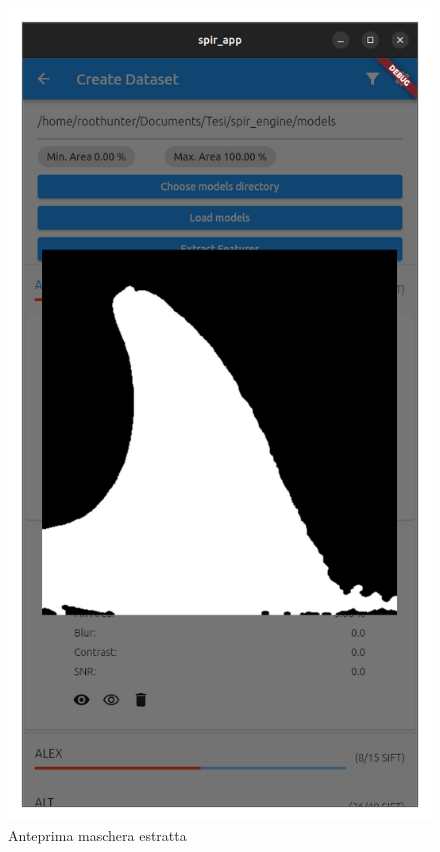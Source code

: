 \documentclass[a4paper,12pt]{report}
\begin{document}
\begin{figure}[H]
\begin{minipage}{0.3\textwidth}
        \centering
        \includegraphics[width=\textwidth]{assets/images/methods/frontend/dataset_mask.png}   
        \caption{Anteprima maschera estratta}
      \end{minipage}
    \end{figure}

    \newpage
      
\end{document}
